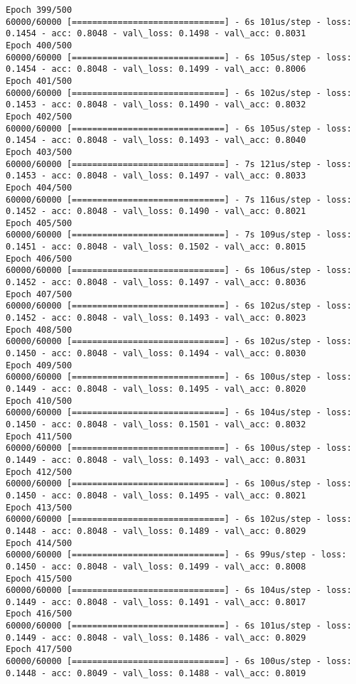 \documentclass[11pt]{article}
\begin{document}
\begin{Verbatim}[commandchars=\\\{\}]
Epoch 399/500
60000/60000 [==============================] - 6s 101us/step - loss: 0.1454 - acc: 0.8048 - val\_loss: 0.1498 - val\_acc: 0.8031
Epoch 400/500
60000/60000 [==============================] - 6s 105us/step - loss: 0.1454 - acc: 0.8048 - val\_loss: 0.1499 - val\_acc: 0.8006
Epoch 401/500
60000/60000 [==============================] - 6s 102us/step - loss: 0.1453 - acc: 0.8048 - val\_loss: 0.1490 - val\_acc: 0.8032
Epoch 402/500
60000/60000 [==============================] - 6s 105us/step - loss: 0.1454 - acc: 0.8048 - val\_loss: 0.1493 - val\_acc: 0.8040
Epoch 403/500
60000/60000 [==============================] - 7s 121us/step - loss: 0.1453 - acc: 0.8048 - val\_loss: 0.1497 - val\_acc: 0.8033
Epoch 404/500
60000/60000 [==============================] - 7s 116us/step - loss: 0.1452 - acc: 0.8048 - val\_loss: 0.1490 - val\_acc: 0.8021
Epoch 405/500
60000/60000 [==============================] - 7s 109us/step - loss: 0.1451 - acc: 0.8048 - val\_loss: 0.1502 - val\_acc: 0.8015
Epoch 406/500
60000/60000 [==============================] - 6s 106us/step - loss: 0.1452 - acc: 0.8048 - val\_loss: 0.1497 - val\_acc: 0.8036
Epoch 407/500
60000/60000 [==============================] - 6s 102us/step - loss: 0.1452 - acc: 0.8048 - val\_loss: 0.1493 - val\_acc: 0.8023
Epoch 408/500
60000/60000 [==============================] - 6s 102us/step - loss: 0.1450 - acc: 0.8048 - val\_loss: 0.1494 - val\_acc: 0.8030
Epoch 409/500
60000/60000 [==============================] - 6s 100us/step - loss: 0.1449 - acc: 0.8048 - val\_loss: 0.1495 - val\_acc: 0.8020
Epoch 410/500
60000/60000 [==============================] - 6s 104us/step - loss: 0.1450 - acc: 0.8048 - val\_loss: 0.1501 - val\_acc: 0.8032
Epoch 411/500
60000/60000 [==============================] - 6s 100us/step - loss: 0.1449 - acc: 0.8048 - val\_loss: 0.1493 - val\_acc: 0.8031
Epoch 412/500
60000/60000 [==============================] - 6s 100us/step - loss: 0.1450 - acc: 0.8048 - val\_loss: 0.1495 - val\_acc: 0.8021
Epoch 413/500
60000/60000 [==============================] - 6s 102us/step - loss: 0.1448 - acc: 0.8048 - val\_loss: 0.1489 - val\_acc: 0.8029
Epoch 414/500
60000/60000 [==============================] - 6s 99us/step - loss: 0.1450 - acc: 0.8048 - val\_loss: 0.1499 - val\_acc: 0.8008
Epoch 415/500
60000/60000 [==============================] - 6s 104us/step - loss: 0.1449 - acc: 0.8048 - val\_loss: 0.1491 - val\_acc: 0.8017
Epoch 416/500
60000/60000 [==============================] - 6s 101us/step - loss: 0.1449 - acc: 0.8048 - val\_loss: 0.1486 - val\_acc: 0.8029
Epoch 417/500
60000/60000 [==============================] - 6s 100us/step - loss: 0.1448 - acc: 0.8049 - val\_loss: 0.1488 - val\_acc: 0.8019

\end{Verbatim}
\end{document}
